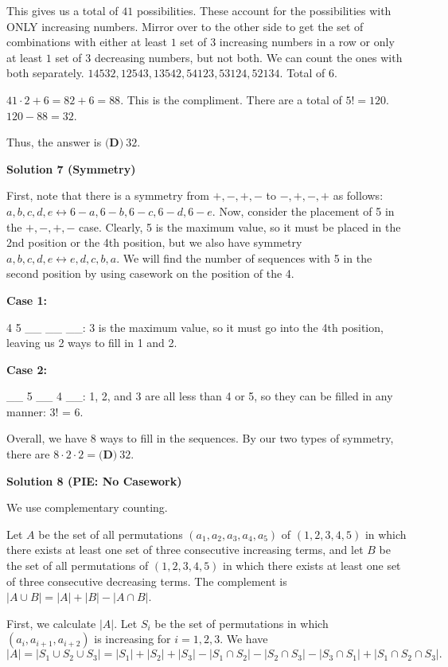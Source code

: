 \begin{enumerate}
 This gives us a total of $41$ possibilities. These account for the possibilities with ONLY increasing numbers. Mirror over to the other side to get the set of combinations with either at least $1$ set of $3$ increasing numbers in a row or only at least $1$ set of $3$ decreasing numbers, but not both. We can count the ones with both separately. $14532, 12543, 13542, 54123, 53124, 52134$. Total of $6$. 

 $41\cdot 2+6=82+6=88$. This is the compliment. There are a total of $5!=120$. $120-88=32$. 

 Thus, the answer is $\boxed{\textbf{(D)} ~32}$.

 



\textbf{Solution 7 (Symmetry)}

First, note that there is a symmetry from $+,-,+,-$ to $-,+,-,+$ as follows: $a, b, c, d, e \leftrightarrow 6-a, 6-b, 6-c, 6-d, 6-e$. Now, consider the placement of 5 in the $+,-,+,-$ case. Clearly, 5 is the maximum value, so it must be placed in the 2nd position or the 4th position, but we also have symmetry $a, b, c, d, e \leftrightarrow e, d, c, b, a$. We will find the number of sequences with 5 in the second position by using casework on the position of the 4.

 \textbf{Case 1: }

 4 5 \_\_ \_\_ \_\_: 3 is the maximum value, so it must go into the 4th position, leaving us 2 ways to fill in 1 and 2.

 \textbf{Case 2: }

 \_\_ 5 \_\_ 4 \_\_: 1, 2, and 3 are all less than 4 or 5, so they can be filled in any manner: 3! = 6. 

 Overall, we have 8 ways to fill in the sequences. By our two types of symmetry, there are $8 \cdot 2 \cdot 2 = \boxed{\textbf{(D)} ~32}$.

 



\textbf{Solution 8 (PIE: No Casework)}

We use complementary counting. 

 Let $A$ be the set of all permutations $(a_1, a_2, a_3, a_4, a_5)$ of $(1,2,3,4,5)$ in which there exists at least one set of three consecutive increasing terms, and let $B$ be the set of all permutations of $(1,2,3,4,5)$ in which there exists at least one set of three consecutive decreasing terms. The complement is $|A \cup B|=|A|+|B|-|A \cap B|$. 

 First, we calculate $|A|$. Let $S_i$ be the set of permutations in which $(a_i, a_{i+1}, a_{i+2})$ is increasing for $i=1,2,3$. We have 
 \[|A|=|S_1 \cup S_2 \cup S_3|=|S_1|+|S_2|+|S_3|-|S_1 \cap S_2|-|S_2 \cap S_3|-|S_3 \cap S_1|+|S_1 \cap S_2 \cap S_3|.\]


\end{enumerate}
